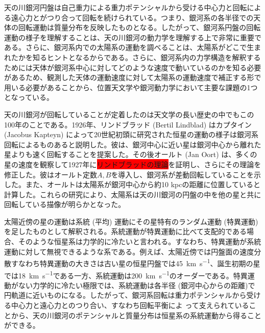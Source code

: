 
天の川銀河円盤は自己重力による重力ポテンシャルから受ける中心力と回転による遠心力とがつり合って回転を続けられている。つまり、銀河系の各半径での天体の回転運動は質量分布を反映したものとなる。したがって、銀河系円盤の回転運動の様子を理解することは、天の川銀河の動力学を理解する上で非常に重要である。さらに、銀河系内での太陽系の運動を調べることは、太陽系がどこで生まれたかを知るヒントとなるからである。さらに、銀河系内の力学構造を解釈するためには天体が銀河系中心に対してどのような速度で動いているのかを知る必要があるため、観測した天体の運動速度に対して太陽系の運動速度で補正する形で用いる必要があることから、位置天文学や銀河動力学において主要な課題の1つとなっている。

天の川銀河が回転していることが定着したのは天文学の長い歴史の中でもこの100年のことである。1926年、リンドブラッド  (Bertil Lindblad) はカプタイン (Jacobus Kapteyn) によって20世紀初頭に研究された恒星の運動の様子は銀河系回転によるものあると説明した。彼は、銀河中心に近い星は銀河中心から離れた星よりも速く回転することを提案した。その後オールト (Jan Oort) は、多くの星の速度を観察して1927年に\colorbox{red}{リンドブラッドの理論}を証明し、さらにその理論を修正した。彼はオールト定数$A,B$を導入し、銀河系が差動回転していることを示した。また、オールトは太陽系が銀河中心から約10 kpcの距離に位置していると計算した。これらの研究により、太陽系は天の川銀河の円盤の中を他の星と共に回転している描像が明らかとなった。

太陽近傍の星の運動は系統 (平均) 運動にその星特有のランダム運動 (特異運動) を足したものとして解釈される。系統運動が特異運動に比べて支配的である場合、そのような恒星系は力学的に冷たいと言われる。すなわち、特異運動が系統運動に対して無視できるような系である。例えば、太陽近傍では円盤面の速度分散すなわち特異運動の大きさは古い星の恒星円盤では\SI{45}{km.s^{-1}}、誕生初期の星では\SI{18}{km.s^{-1}}である一方、系統運動は\SI{200}{km.s^{-1}}のオーダーである。特異運動がない力学的に冷たい極限では、系統運動は各半径 (銀河中心からの距離)で円軌道に近いものになる。したがって、銀河系回転は重力ポテンシャルから受ける中心力と遠心力とのつり合い、すなわち回転平衡によ
って支えられていることから、天の川銀河のポテンシャルと質量分布は恒星系の系統運動から得ることができる。


